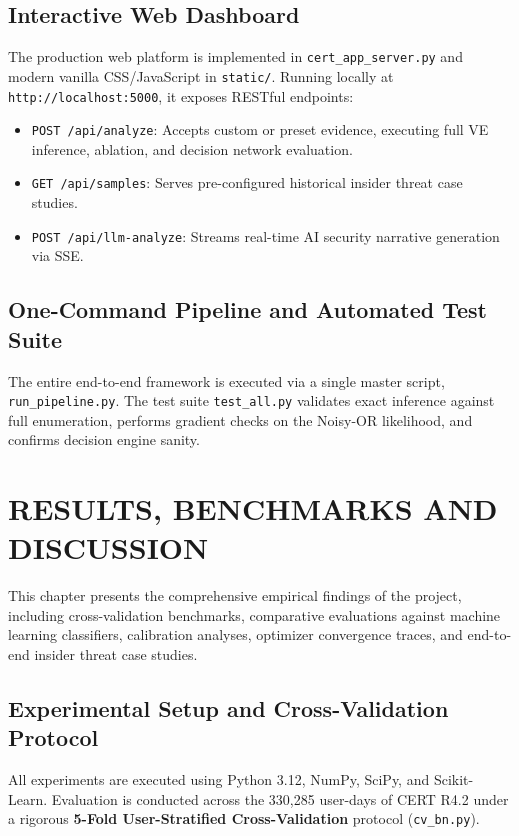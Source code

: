 \documentclass[12pt,a4paper]{report}
\begin{document}
\section{Interactive Web Dashboard}
The production web platform is implemented in \texttt{cert\_app\_server.py} and modern vanilla CSS/JavaScript in \texttt{static/}. Running locally at \texttt{http://localhost:5000}, it exposes RESTful endpoints:
\begin{itemize}
    \item \texttt{POST /api/analyze}: Accepts custom or preset evidence, executing full VE inference, ablation, and decision network evaluation.
    \item \texttt{GET /api/samples}: Serves pre-configured historical insider threat case studies.
    \item \texttt{POST /api/llm-analyze}: Streams real-time AI security narrative generation via SSE.
\end{itemize}

\section{One-Command Pipeline and Automated Test Suite}
The entire end-to-end framework is executed via a single master script, \texttt{run\_pipeline.py}. The test suite \texttt{test\_all.py} validates exact inference against full enumeration, performs gradient checks on the Noisy-OR likelihood, and confirms decision engine sanity.


\chapter{RESULTS, BENCHMARKS AND DISCUSSION}

This chapter presents the comprehensive empirical findings of the project, including cross-validation benchmarks, comparative evaluations against machine learning classifiers, calibration analyses, optimizer convergence traces, and end-to-end insider threat case studies.

\section{Experimental Setup and Cross-Validation Protocol}
All experiments are executed using Python 3.12, NumPy, SciPy, and Scikit-Learn. Evaluation is conducted across the 330,285 user-days of CERT R4.2 under a rigorous \textbf{5-Fold User-Stratified Cross-Validation} protocol (\texttt{cv\_bn.py}). 
\end{document}

